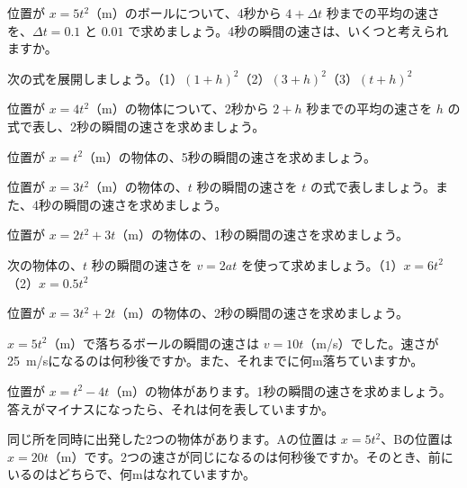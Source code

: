 \clearpage
\bkendproblems
{}

\bkproblem 位置が $x=5t^2$（m）のボールについて、4秒から $4+\Delta t$ 秒までの平均の速さを、$\Delta t=0.1$ と $0.01$ で求めましょう。4秒の瞬間の速さは、いくつと考えられますか。

\bkproblem 次の式を展開しましょう。\quad（1）$(1+h)^2$\quad（2）$(3+h)^2$\quad（3）$(t+h)^2$

\bkproblem 位置が $x=4t^2$（m）の物体について、2秒から $2+h$ 秒までの平均の速さを $h$ の式で表し、2秒の瞬間の速さを求めましょう。

\bkproblem 位置が $x=t^2$（m）の物体の、5秒の瞬間の速さを求めましょう。

\bkproblem 位置が $x=3t^2$（m）の物体の、$t$ 秒の瞬間の速さを $t$ の式で表しましょう。また、4秒の瞬間の速さを求めましょう。

\bkproblem 位置が $x=2t^2+3t$（m）の物体の、1秒の瞬間の速さを求めましょう。

\bkproblem 次の物体の、$t$ 秒の瞬間の速さを $v=2at$ を使って求めましょう。\quad（1）$x=6t^2$\quad（2）$x=0.5t^2$


\bkproblem 位置が $x=3t^2+2t$（m）の物体の、2秒の瞬間の速さを求めましょう。

\bkproblem $x=5t^2$（m）で落ちるボールの瞬間の速さは $v=10t$（m/s）でした。速さが\qty{25}{m/s}になるのは何秒後ですか。また、それまでに何m落ちていますか。

\bkproblem 位置が $x=t^2-4t$（m）の物体があります。1秒の瞬間の速さを求めましょう。答えがマイナスになったら、それは何を表していますか。

\bkproblem 同じ所を同時に出発した2つの物体があります。Aの位置は $x=5t^2$、Bの位置は $x=20t$（m）です。2つの速さが同じになるのは何秒後ですか。そのとき、前にいるのはどちらで、何mはなれていますか。

